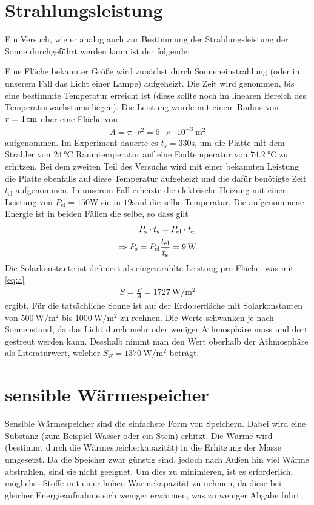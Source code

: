 \documentclass[12pt,a4paper,titlepage,headinclude,bibtotoc]{scrartcl}
\begin{document}
\section{Strahlungsleistung}
Ein Versuch, wie er analog auch zur Bestimmung der Strahlungsleistung der Sonne durchgeführt werden kann ist der folgende:

Eine Fläche bekannter Größe wird zunächst durch Sonneneinstrahlung (oder in unserem Fall das Licht einer Lampe) aufgeheizt.
Die Zeit wird genommen, bis eine bestimmte Temperatur erreicht ist (diese sollte noch im linearen Bereich des Temperaturwachstums liegen).
Die Leistung wurde mit einem Radius von $r=\SI4{\centi\meter}$ über eine Fläche von
\begin{align}
	A=\pi\cdot r^2=\SI{5e-3}{\meter\squared}\label{eq:a}
\end{align}
aufgenommen.
Im Experiment dauerte es $t_s=330\si\second$, um die Platte mit dem Strahler von $\SI{24}{\celsius}$ Raumtemperatur auf eine Endtemperatur von $\SI{74.2}{\celsius}$ zu erhitzen.
Bei dem zweiten Teil des Versuchs wird mit einer bekannten Leistung die Platte ebenfalls auf diese Temperatur aufgeheizt und die dafür benötigte Zeit $t_\text{el}$ aufgenommen.
In unserem Fall erheizte die elektrische Heizung mit einer Leistung von $P_\text{el}=150\si\watt$ sie in $19\si\second$auf die selbe Temperatur.
Die aufgenommene Energie ist in beiden Fällen die selbe, so dass gilt
\begin{align*}
	P_\text s\cdot t_\text s=P_\text{el}\cdot t_\text{el}\\
	\Rightarrow P_\text s=P_\text{el}\frac{t_\text{el}}{t_\text s}=\SI9\watt
\end{align*}
Die Solarkonstante ist definiert als eingestrahlte Leistung pro Fläche, was mit \ref{eq:a}
\begin{align*}
	S=\frac{P}{A}=\SI{1727}{\watt\per\meter\squared}
\end{align*}
ergibt.
Für die tatsächliche Sonne ist auf der Erdoberfläche mit Solarkonstanten von $\SI{500}{\watt\per\meter\squared}$ bis $\SI{1000}{\watt\per\meter\squared}$ zu rechnen.
Die Werte schwanken je nach Sonnenstand, da das Licht durch mehr oder weniger Athmosphäre muss und dort gestreut werden kann.
Desshalb nimmt man den Wert oberhalb der Athmosphäre als Literaturwert, welcher $S_E=\SI{1370}{\watt\per\meter\squared}$ beträgt.





\section{sensible Wärmespeicher}
Sensible Wärmespeicher sind die einfachste Form von Speichern.
Dabei wird eine Substanz (zum Beispiel Wasser oder ein Stein) erhitzt.
Die Wärme wird (bestimmt durch die Wärmespeicherkapazität) in die Erhitzung der Masse umgesetzt.
Da die Speicher zwar günstig sind, jedoch nach Außen hin viel Wärme abstrahlen, sind sie nicht geeignet.
Um dies zu minimieren, ist es erforderlich, möglichst Stoffe mit einer hohen Wärmekapazität zu nehmen, da diese bei gleicher Energieaufnahme sich weniger erwärmen, was zu weniger Abgabe führt.
\end{document}
